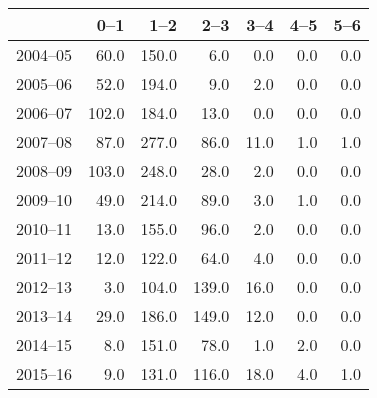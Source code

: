\begin{table}[ht]
\centering
\begin{tabular}{rrrrrrr}
  \hline
 & 0--1 & 1--2 & 2--3 & 3--4 & 4--5 & 5--6 \\ 
  \hline
2004--05 & 60.0 & 150.0 & 6.0 & 0.0 & 0.0 & 0.0 \\ 
  2005--06 & 52.0 & 194.0 & 9.0 & 2.0 & 0.0 & 0.0 \\ 
  2006--07 & 102.0 & 184.0 & 13.0 & 0.0 & 0.0 & 0.0 \\ 
  2007--08 & 87.0 & 277.0 & 86.0 & 11.0 & 1.0 & 1.0 \\ 
  2008--09 & 103.0 & 248.0 & 28.0 & 2.0 & 0.0 & 0.0 \\ 
  2009--10 & 49.0 & 214.0 & 89.0 & 3.0 & 1.0 & 0.0 \\ 
  2010--11 & 13.0 & 155.0 & 96.0 & 2.0 & 0.0 & 0.0 \\ 
  2011--12 & 12.0 & 122.0 & 64.0 & 4.0 & 0.0 & 0.0 \\ 
  2012--13 & 3.0 & 104.0 & 139.0 & 16.0 & 0.0 & 0.0 \\ 
  2013--14 & 29.0 & 186.0 & 149.0 & 12.0 & 0.0 & 0.0 \\ 
  2014--15 & 8.0 & 151.0 & 78.0 & 1.0 & 2.0 & 0.0 \\ 
  2015--16 & 9.0 & 131.0 & 116.0 & 18.0 & 4.0 & 1.0 \\ 
   \hline
\end{tabular}
\end{table}
